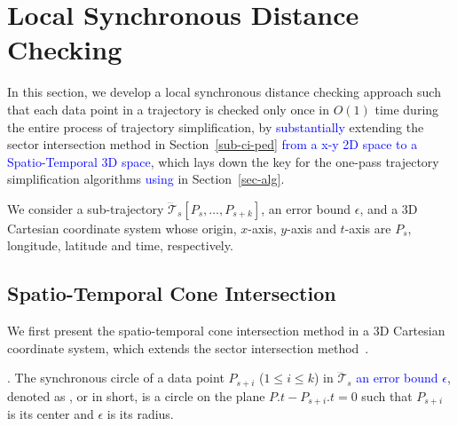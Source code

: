 \section{Local Synchronous Distance Checking}
\label{sec-localcheck}


In this section, we develop a local synchronous distance checking approach such that each data point in a trajectory is checked only once in $O(1)$ time during the entire process of trajectory simplification, by \textcolor{blue}{substantially} extending the sector intersection method in Section~\ref{sub-ci-ped} \textcolor{blue}{from a x-y 2D space to a Spatio-Temporal 3D space}, which lays down the key for the one-pass trajectory simplification algorithms \textcolor{blue}{using \sed} in Section~\ref{sec-alg}.

We consider a sub-trajectory $\dddot{\mathcal{T}}_s[P_s, \ldots, P_{s+k}]$, an error bound $\epsilon$, and a 3D Cartesian coordinate system whose origin, $x$-axis, $y$-axis and $t$-axis  are $P_s$, longitude, latitude and time, respectively.

\subsection{Spatio-Temporal Cone Intersection}

We first present the spatio-temporal cone intersection method in a 3D Cartesian coordinate system, which extends the sector intersection method~\cite{Williams:Longest, Sklansky:Cone, Zhao:Sleeve}. %





. The synchronous circle of a data point $P_{s+i}$ ($1\le i\le k$) in $\dddot{\mathcal{T}}_s$ \textcolor{blue}{\wrt an error bound $\epsilon$}, denoted as , or  in short, is a circle on the plane $P.t-P_{s+i}.t = 0$ such that $P_{s+i}$ is its center and $\epsilon$ is its radius.


